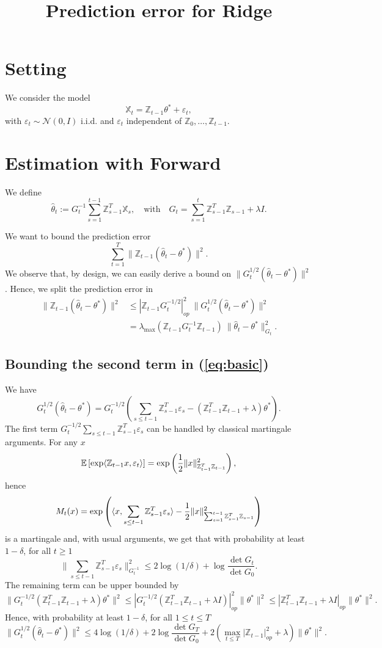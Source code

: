 \documentclass{article}
\title{Prediction error for Ridge}
\theoremstyle{definition}
\newcommand{\pa}[1]{\left(#1\right)}
\newcommand{\cro}[1]{\left[#1\right]}
\newcommand{\bbZ}{\mathbb{Z}}
\newcommand{\bbX}{\mathbb{X}}
\newcommand{\bbE}{\mathbb{E}}
\newcommand{\eps}{\varepsilon}
\newcommand{\hte}{\widehat \theta}
\begin{document}
\maketitle
 
\section{Setting}
We consider the model
$$\bbX_t = \bbZ_{t-1} \theta^* + \eps_t,$$
with  $\eps_{t}\sim\mathcal{N}(0,I)$ i.i.d. and $\eps_{t}$ independent of $\bbZ_{0},\ldots,\bbZ_{t-1}$.

\section{Estimation with Forward}
We define
$$\hte_{t}:= G_{t}^{-1} \sum_{s=1}^{t-1}\bbZ^T_{s-1}\bbX_{s},\quad \textrm{with}\quad G_{t}=\sum_{s=1}^{t} \bbZ^T_{s-1}\bbZ_{s-1}+\lambda I.$$

We want to bound the prediction error 
$$\sum_{t=1}^T \|\bbZ_{t-1} (\hte_{t}-\theta^*)\|^2.$$
We observe that, by design, we can easily derive a bound on $\|G_{t}^{1/2} (\hte_{t}-\theta^*)\|^2$. Hence, we split the prediction error in 
\begin{align}
\|\bbZ_{t-1} (\hte_{t}-\theta^*)\|^2&\leq |\bbZ_{t-1}G_{t}^{-1/2}|^2_{op}\ \|G_{t}^{1/2} (\hte_{t}-\theta^*)\|^2 \nonumber\\
 &= \lambda_{\max} (\bbZ_{t-1}G_{t}^{-1}\bbZ_{t-1}) \ \|\hte_{t}-\theta^*\|^2_{G_{t}}.\label{eq:basic}
\end{align}
 
\subsection{Bounding the second term in (\ref{eq:basic})} 
We have 
$$G_{t}^{1/2}(\hte_{t}-\theta^*) = G_{t}^{-1/2} \pa{\sum_{s\leq t-1} \bbZ_{s-1}^T\eps_{s}-(\bbZ_{t-1}^T\bbZ_{t-1}+\lambda) \theta^*}.$$
The first term $G_{t}^{-1/2} \sum_{s\leq t-1} \bbZ_{s-1}^T\eps_{s}$ can be handled by classical martingale arguments.
For any $x$ 
$$\bbE\cro{\exp\langle \bbZ_{t-1}x, \eps_{t}\rangle}=\exp\pa{{1\over 2} \|x\|^2_{\bbZ_{t-1}^T\bbZ_{t-1}}},$$
hence 
$$M_{t}(x)=\exp\pa{\langle x, \sum_{s\leq t-1} \bbZ_{s-1}^T\eps_{s}\rangle-{1\over 2} \|x\|^2_{\sum_{s=1}^{t-1}\bbZ_{s-1}^T\bbZ_{s-1}}}$$
 is a martingale and, with usual arguments, we get that with probability at least $1-\delta$, for all $t\geq 1$
 $$\|\sum_{s\leq t-1} \bbZ_{s-1}^T\eps_{s}\|_{G_{t}^{-1}}^2 \leq 2\log(1/\delta)+\log \frac{\operatorname{det} G_{t}}{\operatorname{det} G_{0}}.$$
 The remaining term can be upper bounded by
 $$\|G_{t}^{-1/2} (\bbZ_{t-1}^T\bbZ_{t-1}+\lambda) \theta^*\|^2\leq |G_{t}^{-1/2} (\bbZ_{t-1}^T\bbZ_{t-1}+\lambda I)|^2_{op} \|\theta^*\|^2\leq |\bbZ_{t-1}^T\bbZ_{t-1}+\lambda I|_{op} \|\theta^*\|^2. $$
Hence,  with probability at least $1-\delta$, for all $1\leq t\leq T$
$$\|G_{t}^{1/2}(\hte_{t}-\theta^*)\|^2 \leq 4\log(1/\delta)+2\log \frac{\operatorname{det} G_{T}}{\operatorname{det} G_{0}} + 2 
  \pa{\max_{t\leq T}|\bbZ_{t-1}|^2_{op}+\lambda} \|\theta^*\|^2.$$
  
\end{document}
